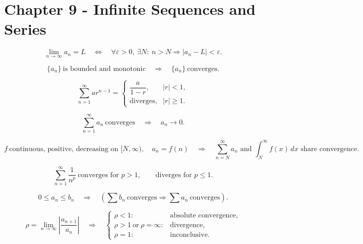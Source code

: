 
\section*{Chapter 9 - Infinite Sequences and Series}

\[
  \lim_{n\to\infty}a_n=L
  \quad\Longleftrightarrow\quad
  \forall\varepsilon>0,\ \exists N:
  \ n>N\Rightarrow|a_n-L|<\varepsilon.
\]

\[
  \{a_n\}\ \text{is bounded and monotonic}
  \quad\Longrightarrow\quad
  \{a_n\}\ \text{converges}.
\]

\[
  \sum_{n=1}^{\infty}ar^{n-1}
  =
  \begin{cases}
    \dfrac{a}{1-r}, & |r|<1,\\[2mm]
    \text{diverges}, & |r|\ge1.
  \end{cases}
\]

\[
  \sum_{n=1}^{\infty}a_n\ \text{converges}
  \quad\Longrightarrow\quad
  a_n\to0.
\]

\[
  f\ \text{continuous, positive, decreasing on }[N,\infty),
  \quad a_n=f(n)
  \quad\Longrightarrow\quad
  \sum_{n=N}^{\infty}a_n
  \text{ and }
  \int_N^\infty f(x)\,dx
  \text{ share convergence}.
\]

\[
  \sum_{n=1}^{\infty}\frac{1}{n^p}
  \ \text{converges for }p>1,
  \qquad
  \text{diverges for }p\le1.
\]

\[
  0\le a_n\le b_n
  \quad\Longrightarrow\quad
  \left(
  \sum b_n\ \text{converges}\Rightarrow\sum a_n\ \text{converges}
  \right).
\]

\[
  \rho=\lim_{n\to\infty}\left|\frac{a_{n+1}}{a_n}\right|
  \quad\Longrightarrow\quad
  \begin{cases}
    \rho<1: & \text{absolute convergence},\\
    \rho>1\ \text{or}\ \rho=\infty: & \text{divergence},\\
    \rho=1: & \text{inconclusive}.
  \end{cases}
\]

